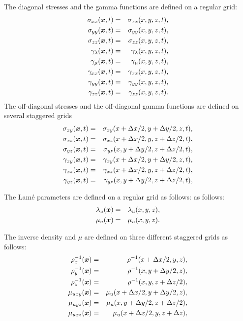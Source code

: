 \documentclass[11pt]{article}
\begin{document}
The diagonal stresses and the gamma functions are defined on a regular grid:
\begin{eqnarray}
   \sigma_{xx}(\mbox{\boldmath $x$}, t) & = & \sigma_{xx}( x, y,z, t), \\
   \sigma_{yy}(\mbox{\boldmath $x$}, t) & = & \sigma_{yy}(x, y, z, t), \\
   \sigma_{zz}(\mbox{\boldmath $x$}, t) & = & \sigma_{zz}(x, y, z, t), \\ 
   \gamma_{\lambda}(\mbox{\boldmath $x$}, t) & = & \gamma_{\lambda}(x, y,  z, t), \\ 
   \gamma_{\mu}(\mbox{\boldmath $x$}, t) & = & \gamma_{\mu}(x, y, z, t), \\ 
   \gamma_{xx}(\mbox{\boldmath $x$}, t) & = & \gamma_{xx}(x, y, z,  t), \\ 
   \gamma_{yy}(\mbox{\boldmath $x$}, t) & = & \gamma_{yy}( x, y, z,  t), \\ 
   \gamma_{zz}(\mbox{\boldmath $x$}, t) & = & \gamma_{zz}(x, y, z,  t). 
\end{eqnarray}
%
The off-diagonal stresses and the off-diagonal gamma functions are defined on
several staggered grids
%
\begin{eqnarray}
   \sigma_{xy}(\mbox{\boldmath $x$}, t) & = & \sigma_{xy}(x +\Delta x/2, y + \Delta y/2, z, t), \\
   \sigma_{xz}(\mbox{\boldmath $x$}, t) & = & \sigma_{xz}(x +\Delta x/2, y,z + \Delta z/2,  t), \\
   \sigma_{yz}(\mbox{\boldmath $x$}, t) & = & \sigma_{yz}(x, y + \Delta y/2, z+\Delta z/2,  t), \\
   \gamma_{xy}(\mbox{\boldmath $x$}, t) & = & \gamma_{xy}(x +\Delta x/2, y + \Delta y/2, z, t), \\
   \gamma_{xz}(\mbox{\boldmath $x$}, t) & = & \gamma_{xz}(x +\Delta x/2, y,z + \Delta z/2,  t), \\
   \gamma_{yz}(\mbox{\boldmath $x$}, t) & = & \gamma_{yz}(x, y + \Delta y/2, z+\Delta z/2,  t), \\
\end{eqnarray}
%

The Lam\'{e} parameters are defined on a regular grid as follows:
as follows:
%
\begin{eqnarray}
   \lambda_u(\mbox{\boldmath $x$}) & = & \lambda_u(x,y,z),\\
   \mu_u(\mbox{\boldmath $x$})     & = & \mu_u(x,y, z).
\end{eqnarray}

The inverse density and $\mu$ are defined  on three different staggered grids as follows:
\begin{eqnarray}
   \rho_x^{-1}(\mbox{\boldmath $x$}) & = & \rho^{-1}(x+\Delta x/2, y, z),\\
   \rho_y^{-1}(\mbox{\boldmath $x$}) & = & \rho^{-1}(x,y+\Delta y/2, z),\\
   \rho_z^{-1}(\mbox{\boldmath $x$}) & = &\rho^{-1}(x,y,z+\Delta z/2),\\
   \mu_{uxy}(\mbox{\boldmath $x$}) & = &   \mu_u(x+\Delta x/2, y+\Delta y/2, z),\\
   \mu_{uyz}(\mbox{\boldmath $x$}) & = &   \mu_u(x, y+\Delta y/2, z+\Delta z/2),\\
   \mu_{uxz}(\mbox{\boldmath $x$}) & = &   \mu_u(x+\Delta x/2, y,z+\Delta z),\\
\end{eqnarray}
\end{document}
